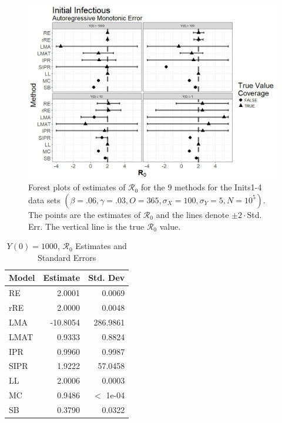 \documentclass[12pt]{article}
\newcommand{\xxsir}{\ensuremath{9} } %
\newcommand{\rr}{\ensuremath{\mathcal{R}_0}}
\begin{document}
\begin{figure}[H]
	\centering
	\includegraphics[scale=0.5]{images/start_arm.jpeg}
	\caption{Forest plots of estimates of $\rr$ for the \xxsir methods for the Inits1-4 data sets $(\beta=.06, \gamma=.03, O=365, \sigma_X=100, \sigma_Y=5, N=10^5)$.  The points are the estimates of $\rr$ and the lines denote $\pm 2\cdot $Std. Err.  The vertical line is the true $\rr$ value.}
\end{figure}


\begin{table}[H]
	
	\centering
	\begin{tabular}[t]{l|r|r}
		\hline
		Model & Estimate & Std. Dev\\
		\hline
		RE & 2.0001 & 0.0069\\
		\hline
		rRE & 2.0000 & 0.0048\\
		\hline
		LMA & -10.8054 & 286.9861\\
		\hline
		LMAT & 0.9333 & 0.8824\\
		\hline
		IPR & 0.9960 & 0.9987\\
		\hline
		SIPR & 1.9222 & 57.0458\\
		\hline
		LL & 2.0006 & 0.0003\\
		\hline
		MC & 0.9486 & $<$ 1e-04\\
		\hline
		SB & 0.3790 & 0.0322\\
		\hline
	\end{tabular}
	\caption{$Y(0) = 1000$, $\rr$ Estimates and Standard Errors}
\end{table}
\end{document}
